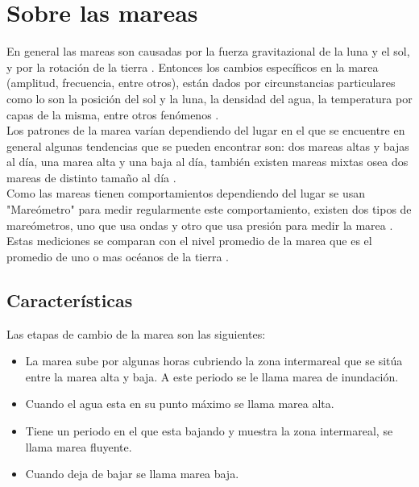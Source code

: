 \documentclass[12pt,letterpaper]{article}
\begin{document}
\section{Sobre las mareas}

En general las mareas son causadas por la fuerza gravitazional de la luna y el sol, y por la rotación de la tierra \cite{a}. Entonces los cambios específicos en la marea (amplitud, frecuencia, entre otros), están dados por circunstancias particulares como lo son la posición del sol y la luna, la densidad del agua, la temperatura por capas de la misma, entre otros fenómenos \cite{a}.\\

Los patrones de la marea varían dependiendo del lugar en el que se encuentre en general algunas tendencias que se pueden encontrar son: dos mareas altas y bajas al día, una marea alta y una baja al día, también existen mareas mixtas osea dos mareas de distinto tamaño al día \cite{a}.\\
Como las mareas tienen comportamientos dependiendo del lugar se usan "Mareómetro" para medir regularmente este comportamiento, existen dos tipos de mareómetros, uno que usa ondas y otro que usa presión para medir la marea \cite{b}. Estas mediciones se comparan con el nivel promedio de la marea que es el promedio de uno o mas océanos de la tierra \cite{c}.\\

\subsection{Características}

Las etapas de cambio de la marea son las siguientes\cite{a}:
\begin{itemize}
\item La marea sube por algunas horas cubriendo la zona intermareal que se sitúa entre la marea alta y baja\cite{d}. A este periodo se le llama marea de inundación.
\item Cuando el agua esta en su  punto máximo se llama marea alta.
\item Tiene un periodo en el que esta bajando y muestra la zona intermareal, se llama marea fluyente. 
\item Cuando deja de bajar se llama marea baja.
\end{itemize}
\end{document}
